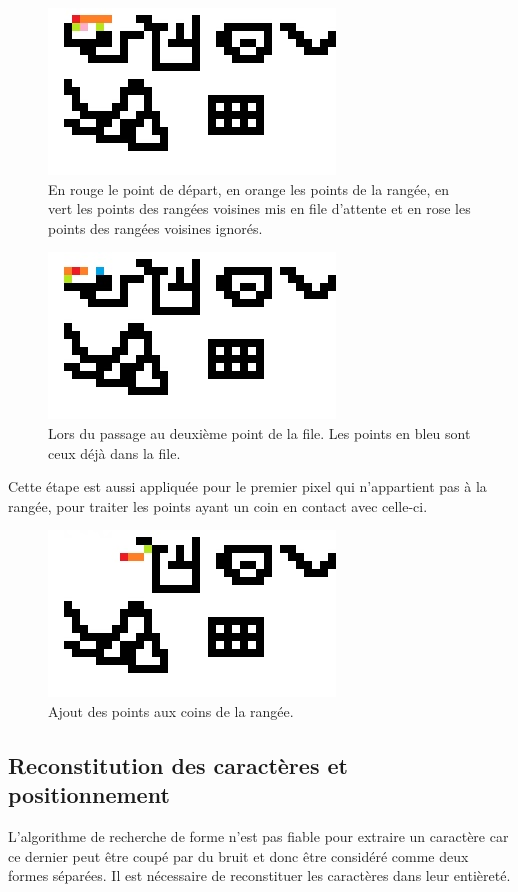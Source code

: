 \documentclass[a4paper, 12pt]{article}
\begin{document}
\begin{figure}[!ht]
\centering
\includegraphics[scale=1]{img/shape_row_neighbors.jpg}
\caption{En rouge le point de départ, en orange les points de la rangée, en vert les points des rangées voisines mis en file d'attente et en rose les points des rangées voisines ignorés.}
\end{figure}

\begin{figure}[!ht]
\centering
\includegraphics[scale=1]{img/shape_row_neighbors_2.jpg}
\caption{Lors du passage au deuxième point de la file. Les points en bleu sont ceux déjà dans la file.}
\end{figure}

Cette étape est aussi appliquée pour le premier pixel qui n'appartient pas à la rangée, pour traiter les points ayant un coin en contact avec celle-ci.

\begin{figure}[!ht]
\centering
\includegraphics[scale=1]{img/shape_row_neighbors_corner.jpg}
\caption{Ajout des points aux coins de la rangée.}
\end{figure}

\subsection{Reconstitution des caractères et positionnement}
L'algorithme de recherche de forme n'est pas fiable pour extraire un caractère car ce dernier peut être coupé par du bruit et donc être considéré comme deux formes séparées. Il est nécessaire de reconstituer les caractères dans leur entièreté.
\end{document}
